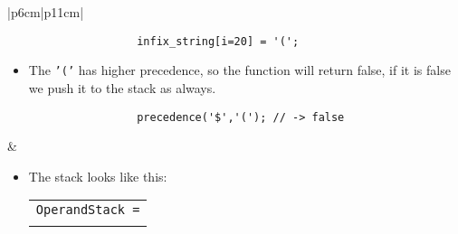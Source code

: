 \begin{center}
\begin{longtable}{ |p{6cm}|p{11cm}| }
         \\
        \hline
        \hline
            {
                \begin{verbatim}
                    infix_string[i=20] = '(';
                \end{verbatim}
            }
            \begin{itemize}
                \item The \texttt{'('} has higher precedence, so the function will return false, if it is false we push it to the stack as always.
            \end{itemize}
            {
                \begin{verbatim}
                    precedence('$','('); // -> false
                \end{verbatim}
            }
            &
            \begin{itemize}
                \item The stack looks like this: 
                    {
                        \begin{tabular}{ c }
                            \texttt{OperandStack =} \\ \\
                        \end{tabular}
                        \begin{bytefield}{10}
                             \\
                        \end{bytefield}
                    }
                

\end{itemize}
\end{longtable}
\end{center}
